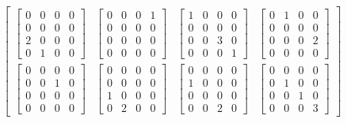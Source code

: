 \documentclass[twocolumn,10pt]{asme2ej}
\begin{document}
\begin{equation}
\begin{bmatrix}
        \begin{bmatrix} 0 & 0 & 0 & 0 \\ 0 & 0 & 0 & 0 \\ 2 & 0 & 0 & 0 \\ 0 & 1 & 0 & 0 \end{bmatrix} &
        \begin{bmatrix} 0 & 0 & 0 & 1 \\ 0 & 0 & 0 & 0 \\ 0 & 0 & 0 & 0 \\ 0 & 0 & 0 & 0 \end{bmatrix} &
        \begin{bmatrix} 1 & 0 & 0 & 0 \\ 0 & 0 & 0 & 0 \\ 0 & 0 & 3 & 0 \\ 0 & 0 & 0 & 1 \end{bmatrix} &
        \begin{bmatrix}0 & 1 & 0 & 0 \\ 0 & 0 & 0 & 0 \\ 0 & 0 & 0 & 2 \\ 0 & 0 & 0 & 0 \end{bmatrix} \\
          \begin{bmatrix} 0 & 0 & 0 & 0 \\ 0 & 0 & 1 & 0 \\ 0 & 0 & 0 & 0 \\ 0 & 0 & 0 & 0 \end{bmatrix} &
          \begin{bmatrix} 0 & 0 & 0 & 0 \\ 0 & 0 & 0 & 0 \\ 1 & 0 & 0 & 0 \\ 0 & 2 & 0 & 0 \end{bmatrix} &
          \begin{bmatrix} 0 & 0 & 0 & 0 \\ 1 & 0 & 0 & 0 \\ 0 & 0 & 0 & 0 \\ 0 & 0 & 2 & 0 \end{bmatrix} &
          \begin{bmatrix}0 & 0 & 0 & 0 \\ 0 & 1 & 0 & 0 \\ 0 & 0 & 1 & 0 \\ 0 & 0 & 0 & 3 \end{bmatrix} \end{bmatrix}
\label{_eq_quadmu}
\end{equation}
\end{document}
